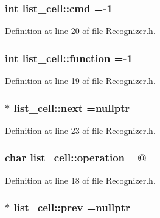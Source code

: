 \subsubsection[{cmd}]{\setlength{\rightskip}{0pt plus 5cm}int list\+\_\+cell\+::cmd =-\/1}\label{structlist__cell_a291b26b04a2dacb522b0c6e781202c3c}


Definition at line 20 of file Recognizer.\+h.

\hypertarget{structlist__cell_a983ddfbf8def7d35bcb3baac813ef99c}{}
\subsubsection[{function}]{\setlength{\rightskip}{0pt plus 5cm}int list\+\_\+cell\+::function =-\/1}\label{structlist__cell_a983ddfbf8def7d35bcb3baac813ef99c}


Definition at line 19 of file Recognizer.\+h.

\hypertarget{structlist__cell_a09c7a56909013720bcf26fa3208e6aa0}{}
\subsubsection[{next}]{$\ast$ list\+\_\+cell\+::next =nullptr}\label{structlist__cell_a09c7a56909013720bcf26fa3208e6aa0}


Definition at line 23 of file Recognizer.\+h.

\hypertarget{structlist__cell_a6ca5af01e34cada2fc702e6b5ab256f2}{}
\subsubsection[{operation}]{\setlength{\rightskip}{0pt plus 5cm}char list\+\_\+cell\+::operation =\textquotesingle{}@\textquotesingle{}}\label{structlist__cell_a6ca5af01e34cada2fc702e6b5ab256f2}


Definition at line 18 of file Recognizer.\+h.

\hypertarget{structlist__cell_a5a88b337b902b21685daa8ab35f05c5b}{}
\subsubsection[{prev}]{$\ast$ list\+\_\+cell\+::prev =nullptr}\label{structlist__cell_a5a88b337b902b21685daa8ab35f05c5b}


